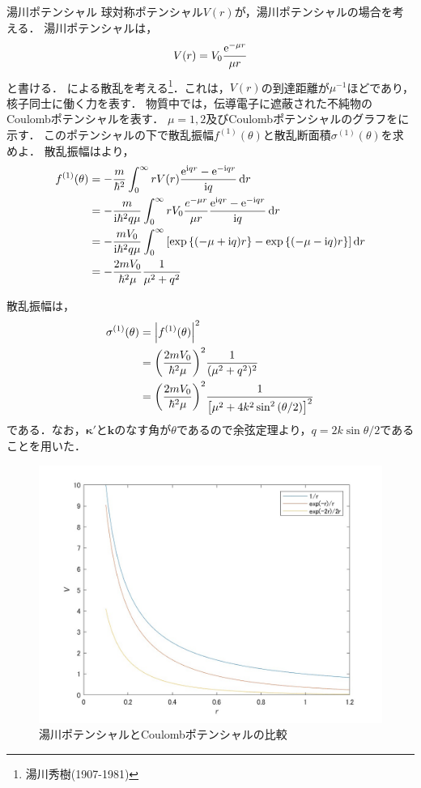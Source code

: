 \documentclass{report}
\begin{document}
  \begin{myex}{湯川ポテンシャル}{}
    球対称ポテンシャル$V(r)$が，湯川ポテンシャルの場合を考える．
    湯川ポテンシャルは，
    \begin{align}
      V(r) = V_0 \frac{\mathrm{e}^{-\mu r}}{\mu r}
    \end{align}
    と書ける．
    による散乱を考える\footnote{湯川秀樹(1907-1981)}．これは，$V(r)$の到達距離が$\mu^{-1}$ほどであり，核子同士に働く力を表す．
    物質中では，伝導電子に遮蔽された不純物のCoulombポテンシャルを表す．
    $\mu = 1,2$及びCoulombポテンシャルのグラフをに示す．
    このポテンシャルの下で散乱振幅$f^{(1)}(\theta)$と散乱断面積$\sigma^{(1)}(\theta)$を求めよ．
    \tcblower
    散乱振幅はより，
    \begin{align}
      f^{(1)}(\theta) &= -\frac{m}{\hbar^2} \int_{0}^{\infty} rV(r) \frac{\mathrm{e}^{\mathrm{i} qr} - \mathrm{e}^{-\mathrm{i} qr}}{\mathrm{i} q} \dd{r} \\ 
      &= -\frac{m}{\mathrm{i} \hbar^2 q \mu} \int_{0}^{\infty} rV_0\frac{e^{-\mu r}}{\mu r} \frac{\mathrm{e}^{\mathrm{i} qr} - \mathrm{e}^{-\mathrm{i} qr}}{\mathrm{i} q}\dd{r} \\
      &= -\frac{mV_0}{\mathrm{i} \hbar^2 q \mu} \int_{0}^{\infty} \qty[\exp\qty{(-\mu + \mathrm{i}q)r} - \exp\qty{(-\mu - \mathrm{i}q)r}] \dd{r} \\
      &= - \frac{2m V_0}{\hbar^2 \mu} \frac{1}{\mu^2 + q^2}
    \end{align}
    \par
    散乱振幅は，
    \begin{align}
      \sigma^{(1)}(\theta) &= \abs{f^{(1)}(\theta)}^2\\
      &= \qty(\frac{2m V_0}{\hbar^2 \mu})^2 \frac{1}{(\mu^2 + q^2)^2}\\
      &= \qty(\frac{2m V_0}{\hbar^2 \mu})^2 \frac{1}{\qty[\mu^2 + 4k^2 \sin^2\qty(\theta/2)]^2}
    \end{align}
    である．なお，$\bm{\kappa'}$と$\bm{k}$のなす角が$\theta$であるので余弦定理より，$q = 2k\sin\theta/2$であることを用いた．
    \begin{figure}[H]
      \centering
      \includegraphics[width = 0.8\columnwidth]{fig/yukawa_potential.jpg}
      \caption{湯川ポテンシャルとCoulombポテンシャルの比較}\label{yukawa-potential-graph}
    \end{figure}
  \end{myex}
\end{document}
